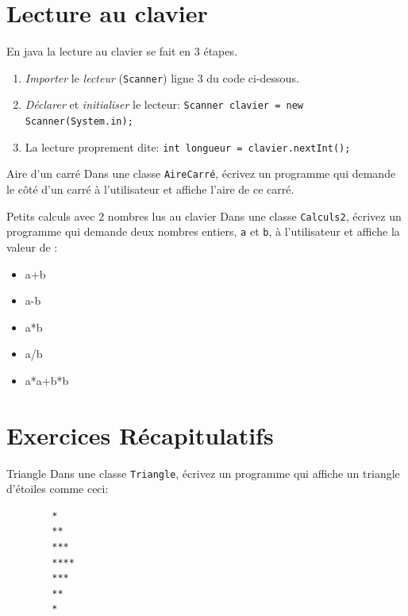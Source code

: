 \documentclass[a4paper,11pt]{article}
\begin{document}
\section{Lecture au clavier}


	En java la lecture au clavier se fait en 3 étapes.

	\begin{enumerate}
		\item \emph{Importer} le \emph{lecteur} (\texttt{Scanner}) ligne 3 du code ci-dessous.
		\item \emph{Déclarer} et \emph{initialiser} le lecteur:  \texttt{Scanner clavier = new Scanner(System.in);}
		\item La lecture proprement dite: \texttt{int longueur = clavier.nextInt();}
	\end{enumerate}




	\begin{Exercice}{Aire d'un carré}
		Dans une classe \texttt{AireCarré}, écrivez un programme qui demande 
		le côté d'un carré à l'utilisateur et affiche l'aire de ce carré.
	\end{Exercice}

	\begin{Exercice}{Petits calculs avec 2 nombres lus au clavier} 
		Dans une classe \texttt{Calculs2}, écrivez un programme qui demande 
		deux nombres entiers, \texttt{a} et \texttt{b}, à l'utilisateur et affiche la valeur de :
		\begin{itemize}
		 	\item a+b
			\item a-b
			\item a*b
			\item a/b
			\item a*a+b*b
		\end{itemize} 
	\end{Exercice}


\section{Exercices Récapitulatifs}

	\begin{Exercice}{Triangle}
		Dans une classe \texttt{Triangle}, écrivez un programme qui affiche un triangle d'étoiles comme ceci:

		\begin{verbatim}
		*
		**
		***
		****
		***
		**
		*
		\end{verbatim}
	\end{Exercice}
\end{document}
